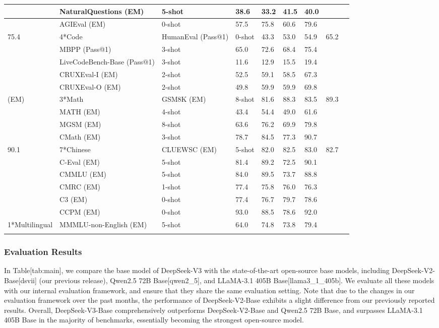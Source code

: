 \documentclass[11pt,a4paper]{article}
\begin{document}
\begin{table}[h]
\begin{tabular}{|l|l|l|l|l|l|l|l|l|}
 & NaturalQuestions (EM) & 5-shot & 38.6 & 33.2 & 41.5 & 40.0 &  &  \\ \hline
 & AGIEval (EM) & 0-shot & 57.5 & 75.8 & 60.6 & 79.6 &  &  \\ \hline
75.4 & 4*Code & HumanEval (Pass@1) & 0-shot & 43.3 & 53.0 & 54.9 & 65.2 &  \\ \hline
 & MBPP (Pass@1) & 3-shot & 65.0 & 72.6 & 68.4 & 75.4 &  &  \\ \hline
 & LiveCodeBench-Base (Pass@1) & 3-shot & 11.6 & 12.9 & 15.5 & 19.4 &  &  \\ \hline
 & CRUXEval-I (EM) & 2-shot & 52.5 & 59.1 & 58.5 & 67.3 &  &  \\ \hline
 & CRUXEval-O (EM) & 2-shot & 49.8 & 59.9 & 59.9 & 69.8 &  &  \\ \hline
(EM) & 3*Math & GSM8K (EM) & 8-shot & 81.6 & 88.3 & 83.5 & 89.3 &  \\ \hline
 & MATH (EM) & 4-shot & 43.4 & 54.4 & 49.0 & 61.6 &  &  \\ \hline
 & MGSM (EM) & 8-shot & 63.6 & 76.2 & 69.9 & 79.8 &  &  \\ \hline
 & CMath (EM) & 3-shot & 78.7 & 84.5 & 77.3 & 90.7 &  &  \\ \hline
90.1 & 7*Chinese & CLUEWSC (EM) & 5-shot & 82.0 & 82.5 & 83.0 & 82.7 &  \\ \hline
 & C-Eval (EM) & 5-shot & 81.4 & 89.2 & 72.5 & 90.1 &  &  \\ \hline
 & CMMLU (EM) & 5-shot & 84.0 & 89.5 & 73.7 & 88.8 &  &  \\ \hline
 & CMRC (EM) & 1-shot & 77.4 & 75.8 & 76.0 & 76.3 &  &  \\ \hline
 & C3 (EM) & 0-shot & 77.4 & 76.7 & 79.7 & 78.6 &  &  \\ \hline
 & CCPM (EM) & 0-shot & 93.0 & 88.5 & 78.6 & 92.0 &  &  \\ \hline
1*Multilingual & MMMLU-non-English (EM) & 5-shot & 64.0 & 74.8 & 73.8 & 79.4 &  &  \\ \hline
 &  &  &  &  &  &  &  &  \\ \hline
\end{tabular}
\end{table}

\subsubsection{Evaluation Results}

In Table[tab:main], we compare the base model of DeepSeek-V3 with the state-of-the-art open-source base models, including DeepSeek-V2-Base[dsvii] (our previous release), Qwen2.5 72B Base[qwen2\_5], and LLaMA-3.1 405B Base[llama3\_1\_405b]. We evaluate all these models with our internal evaluation framework, and ensure that they share the same evaluation setting. Note that due to the changes in our evaluation framework over the past months, the performance of DeepSeek-V2-Base exhibits a slight difference from our previously reported results. Overall, DeepSeek-V3-Base comprehensively outperforms DeepSeek-V2-Base and Qwen2.5 72B Base, and surpasses LLaMA-3.1 405B Base in the majority of benchmarks, essentially becoming the strongest open-source model.
\end{document}
